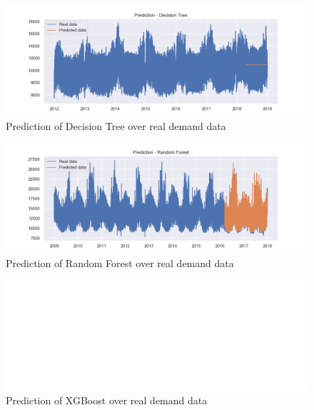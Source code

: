 \begin{figure}[!htpb]
\centering
\includegraphics[width=1.0\textwidth,height=\textheight,keepaspectratio]{Figures/DecisionTree_pred.png}
\caption{Prediction of Decision Tree over real demand data}
\label{figDecisionTree1}
\end{figure}


\begin{figure}[!htpb]
\centering
\includegraphics[width=1.0\textwidth,height=\textheight,keepaspectratio]{Figures/RandomForest_pred.png}
\caption{Prediction of Random Forest over real demand data}
\label{figRandForest1}
\end{figure}



\begin{figure}[!htpb]
\centering
\includegraphics[width=1.0\textwidth,height=\textheight,keepaspectratio]{Figures/XGBoost_pred.png}
\caption{Prediction of XGBoost over real demand data}
\label{figXGB1}
\end{figure}


